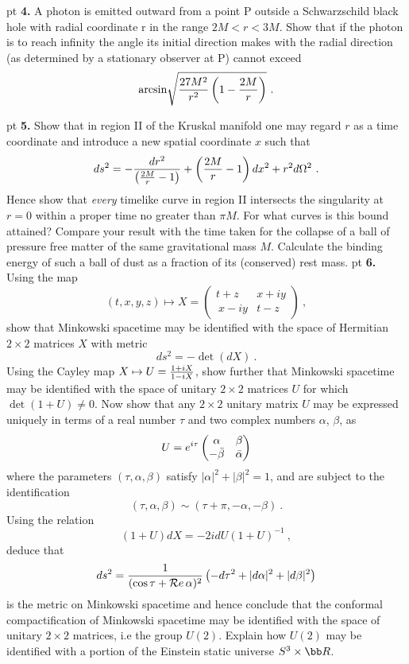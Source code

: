  pt
\noindent
{\bf 4.} A photon is emitted outward from a point P outside
a Schwarzschild black hole with radial coordinate r in the range
$2M<r<3M$. Show that if the photon is to reach infinity the angle its
initial direction makes with the radial direction (as determined by 
a stationary observer at P) cannot exceed
$$
{\rm arcsin} \sqrt{{27M^2\over r^2}\left( 1-{2M\over r}\right)}\ .
$$

 pt
\noindent
{\bf 5.} Show that in region II of the Kruskal manifold one may
regard $r$ as a time coordinate and introduce a new spatial
coordinate $x$ such that
$$
ds^2 = -{dr^2\over \left({2M\over r} -1\right)} +\left({2M\over
r}-1\right)dx^2 + r^2d\Omega^2\ .
$$
Hence show that {\it every} timelike
curve in region II intersects the singularity at $r=0$ within a proper
time no greater than $\pi M$. For what curves is this bound attained?
Compare your result with the time taken for the collapse of a ball of
pressure free matter of the same gravitational mass $M$. Calculate
the binding energy of such a ball of dust as a fraction of its
(conserved) rest mass.
 pt
\noindent
{\bf 6.} Using the map
$$
(t,x,y,z) \mapsto X= \begin{pmatrix}t+z & x+iy\\\ x-iy & t-z\end{pmatrix}\ ,
$$
show that Minkowski spacetime may be identified with the space of
Hermitian $2\times 2$ matrices $X$ with metric
$$
ds^2 = -\det (dX)\ .
$$
Using the Cayley map $X\mapsto U={1+iX\over1-iX}$, show further that
Minkowski spacetime may be identified with the space of unitary
$2\times 2$ matrices $U$ for which $\det (1+U)\ne0$. Now show that any
$2\times 2$ unitary matrix $U$ may be expressed uniquely in terms of
a real number $\tau$ and two complex numbers $\alpha$, $\beta$, as 
$$
U=e^{i\tau}\begin{pmatrix}\alpha & \beta\cr -\bar\beta & \bar\alpha\end{pmatrix}
$$
where the parameters $(\tau,\alpha,\beta)$ satisfy $|\alpha|^2
+|\beta|^2 =1$, and are subject to the identification 
$$
(\tau,\alpha,\beta) \sim (\tau +\pi, -\alpha, -\beta)\ .
$$
Using the relation
$$
(1+U)dX = -2i dU(1+U)^{-1}\ ,
$$
deduce that 
$$
ds^2 = {1\over (\cos \tau + {\cal R}e\,\alpha)^2}\left(-d\tau^2
+|d\alpha|^2 + |d\beta|^2\right) 
$$
is the metric on Minkowski spacetime and hence conclude that the
conformal compactification of Minkowski spacetime may be identified
with the space of unitary $2\times 2$ matrices, i.e the group
$U(2)$. Explain how $U(2)$ may be identified with a portion of the
Einstein static universe $S^3\times {\bb R}$.

